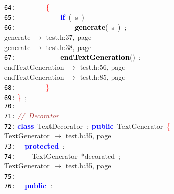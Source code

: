 \documentclass{article}
\begin{document}
\mbox{}\texttt{\textcolor{Black}{64:}} \ \ \ \ \ \ \ \ \textcolor{Red}{\{} \\
\mbox{}\texttt{\textcolor{Black}{65:}} \ \ \ \ \ \ \ \ \ \ \ \ \textbf{\textcolor{Blue}{if}}\ \textcolor{BrickRed}{(}\ s\ \textcolor{BrickRed}{)} \\
\mbox{}\texttt{\textcolor{Black}{66:}} \ \ \ \ \ \ \ \ \ \ \ \ \ \ \ \ \textbf{\textcolor{Black}{generate}}\textcolor{BrickRed}{(}\ s\ \textcolor{BrickRed}{)}\ \textcolor{BrickRed}{;} \\
\mbox{}{\hfill generate $\rightarrow$ test.h:37, page~\pageref{test.h:37}} \\
\mbox{}{\hfill generate $\rightarrow$ test.h:38, page~\pageref{test.h:38}} \\
\mbox{}\texttt{\textcolor{Black}{67:}} \ \ \ \ \ \ \ \ \ \ \ \ \textbf{\textcolor{Black}{endTextGeneration}}\textcolor{BrickRed}{()}\ \textcolor{BrickRed}{;} \\
\mbox{}{\hfill endTextGeneration $\rightarrow$ test.h:56, page~\pageref{test.h:56}} \\
\mbox{}{\hfill endTextGeneration $\rightarrow$ test.h:85, page~\pageref{test.h:85}} \\
\mbox{}\texttt{\textcolor{Black}{68:}} \ \ \ \ \ \ \ \ \textcolor{Red}{\}} \\
\mbox{}\texttt{\textcolor{Black}{69:}} \textcolor{Red}{\}}\ \textcolor{BrickRed}{;} \\
\mbox{}\texttt{\textcolor{Black}{70:}}  \\
\mbox{}\texttt{\textcolor{Black}{71:}} \textit{\textcolor{Brown}{//\ Decorator}} \\
\mbox{}\texttt{\textcolor{Black}{72:}} \textbf{\textcolor{Blue}{class}}\ \label{test.h:72}TextDecorator\ \textcolor{BrickRed}{:}\ \textbf{\textcolor{Blue}{public}}\ TextGenerator\ \textcolor{Red}{\{} \\
\mbox{}{\hfill TextGenerator $\rightarrow$ test.h:35, page~\pageref{test.h:35}} \\
\mbox{}\texttt{\textcolor{Black}{73:}} \ \ \textbf{\textcolor{Blue}{protected}}\ \textcolor{BrickRed}{:} \\
\mbox{}\texttt{\textcolor{Black}{74:}} \ \ \ \ TextGenerator\ \textcolor{BrickRed}{*}\label{test.h:74}decorated\ \textcolor{BrickRed}{;} \\
\mbox{}{\hfill TextGenerator $\rightarrow$ test.h:35, page~\pageref{test.h:35}} \\
\mbox{}\texttt{\textcolor{Black}{75:}} \ \  \\
\mbox{}\texttt{\textcolor{Black}{76:}} \ \ \textbf{\textcolor{Blue}{public}}\ \textcolor{BrickRed}{:} \\
\end{document}

